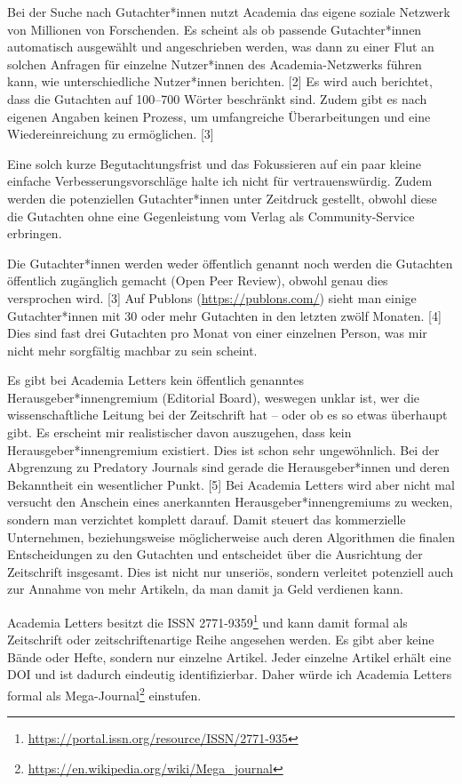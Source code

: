 \documentclass[a4paper,
fontsize=11pt,
oneside,
numbers=noperiodatend,
parskip=half-,
bibliography=totoc,
final
]{scrartcl}
\begin{document}
Bei der Suche nach Gutachter*innen nutzt Academia das eigene soziale
Netzwerk von Millionen von Forschenden. Es scheint als ob passende
Gutachter*innen automatisch ausgewählt und angeschrieben werden, was
dann zu einer Flut an solchen Anfragen für einzelne Nutzer*innen des
Academia-Netzwerks führen kann, wie unterschiedliche Nutzer*innen
berichten. {[}2{]} Es wird auch berichtet, dass die Gutachten auf
100--700 Wörter beschränkt sind. Zudem gibt es nach eigenen Angaben
keinen Prozess, um umfangreiche Überarbeitungen und eine
Wiedereinreichung zu ermöglichen. {[}3{]}

Eine solch kurze Begutachtungsfrist und das Fokussieren auf ein paar
kleine einfache Verbesserungsvorschläge halte ich nicht für
vertrauenswürdig. Zudem werden die potenziellen Gutachter*innen unter
Zeitdruck gestellt, obwohl diese die Gutachten ohne eine Gegenleistung
vom Verlag als Community-Service erbringen.

Die Gutachter*innen werden weder öffentlich genannt noch werden die
Gutachten öffentlich zugänglich gemacht (Open Peer Review), obwohl genau
dies versprochen wird. {[}3{]} Auf Publons (\url{https://publons.com/})
sieht man einige Gutachter*innen mit 30 oder mehr Gutachten in den
letzten zwölf Monaten. {[}4{]} Dies sind fast drei Gutachten pro Monat
von einer einzelnen Person, was mir nicht mehr sorgfältig machbar zu
sein scheint.

Es gibt bei Academia Letters kein öffentlich genanntes
Herausgeber*innengremium (Editorial Board), weswegen unklar ist, wer die
wissenschaftliche Leitung bei der Zeitschrift hat -- oder ob es so etwas
überhaupt gibt. Es erscheint mir realistischer davon auszugehen, dass
kein Herausgeber*innengremium existiert. Dies ist schon sehr
ungewöhnlich. Bei der Abgrenzung zu Predatory Journals sind gerade die
Herausgeber*innen und deren Bekanntheit ein wesentlicher Punkt. {[}5{]}
Bei Academia Letters wird aber nicht mal versucht den Anschein eines
anerkannten Herausgeber*innengremiums zu wecken, sondern man verzichtet
komplett darauf. Damit steuert das kommerzielle Unternehmen,
beziehungsweise möglicherweise auch deren Algorithmen die finalen
Entscheidungen zu den Gutachten und entscheidet über die Ausrichtung der
Zeitschrift insgesamt. Dies ist nicht nur unseriös, sondern verleitet
potenziell auch zur Annahme von mehr Artikeln, da man damit ja Geld
verdienen kann.

Academia Letters besitzt die ISSN 2771-9359\footnote{\href{https://portal.issn.org/resource/ISSN/2771-9359}{https://portal.issn.org/resource/ISSN/2771-935}}
und kann damit formal als Zeitschrift oder zeitschriftenartige Reihe
angesehen werden. Es gibt aber keine Bände oder Hefte, sondern nur
einzelne Artikel. Jeder einzelne Artikel erhält eine DOI und ist dadurch
eindeutig identifizierbar. Daher würde ich Academia Letters formal als
Mega-Journal\footnote{\url{https://en.wikipedia.org/wiki/Mega_journal}}
einstufen.
\end{document}
